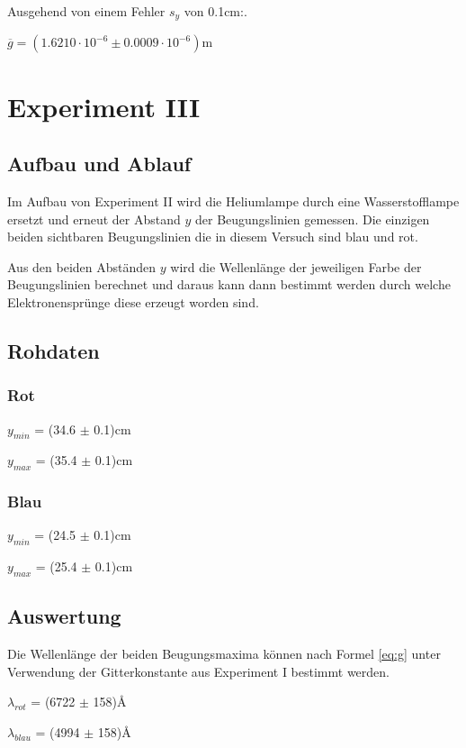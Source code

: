 \documentclass[12pt,a4paper]{article}
\begin{document}
Ausgehend von einem Fehler $s_y$ von 0.1cm:.\vspace{5pt}

$\overline{g} = (1.6210\cdot 10^{-6} \pm 0.0009\cdot 10^{-6})$m

\section*{Experiment III}

\subsection*{Aufbau und Ablauf}
Im Aufbau von Experiment II wird die Heliumlampe durch eine Wasserstoff\-lampe ersetzt und erneut der Abstand $y$ der Beugungslinien gemessen. Die einzigen beiden sichtbaren Beugungslinien die in diesem Versuch sind blau und rot.

Aus den beiden Abst\"anden $y$ wird die Wellenl\"ange der jeweiligen Farbe der Beugungslinien berechnet und daraus kann dann bestimmt werden durch welche Elektronenspr\"unge diese erzeugt worden sind.

\subsection*{Rohdaten}
\subsubsection*{Rot}
$y_{min}$ = (34.6 $\pm$ 0.1)cm

$y_{max}$ = (35.4 $\pm$ 0.1)cm

\subsubsection*{Blau}
$y_{min}$ = (24.5 $\pm$ 0.1)cm

$y_{max}$ = (25.4 $\pm$ 0.1)cm

\subsection*{Auswertung}
Die Wellenl\"ange der beiden Beugungsmaxima k\"onnen nach Formel \ref{eq:g} unter Verwendung der Gitterkonstante aus Experiment I bestimmt werden.\vspace{5pt}

$\lambda_{rot}$ = (6722 $\pm$ 158)\AA

$\lambda_{blau}$ = (4994 $\pm$ 158)\AA
\end{document}
